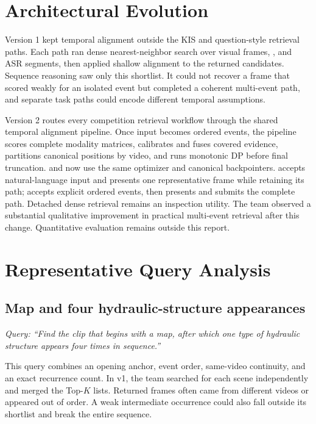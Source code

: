 \section{Architectural Evolution}

Version 1 kept temporal alignment outside the KIS and question-style retrieval
paths. Each path ran dense nearest-neighbor search over visual frames,
\FrameContext{}, and ASR segments, then applied shallow alignment to the returned
candidates. Sequence reasoning saw only this shortlist. It could not recover a
frame that scored weakly for an isolated event but completed a coherent
multi-event path, and separate task paths could encode different temporal
assumptions.

Version 2 routes every competition retrieval workflow through the shared
temporal alignment pipeline. Once input becomes ordered events, the
pipeline scores complete modality matrices, calibrates and fuses covered
evidence, partitions canonical positions by video, and runs monotonic DP before
final truncation. \KIS{} and \TRAKE{} now use the same optimizer and canonical
backpointers. \KIS{} accepts natural-language input and presents one
representative frame while retaining its path; \TRAKE{} accepts explicit ordered
events, then presents and submits the complete path. Detached dense retrieval
remains an inspection utility. The team observed a substantial qualitative
improvement in practical multi-event retrieval after this change. Quantitative
evaluation remains outside this report.

\section{Representative Query Analysis}

\subsection{Map and four hydraulic-structure appearances}

\emph{Query: ``Find the clip that begins with a map, after which one type of
hydraulic structure appears four times in sequence.''}

This query combines an opening anchor, event order, same-video continuity, and an
exact recurrence count. In v1, the team searched for each scene independently and
merged the Top-$K$ lists. Returned frames often came from different videos or
appeared out of order. A weak intermediate occurrence could also fall outside its
shortlist and break the entire sequence.

